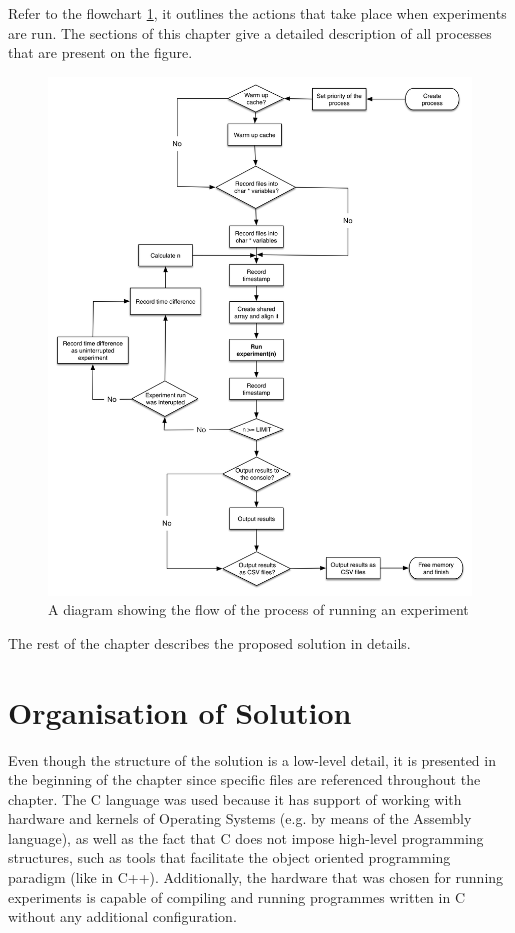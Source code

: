 Refer to the flowchart \ref{flowExperiment}, it outlines the actions that take place when experiments are run. The sections of this chapter give a detailed description of all processes that are present on the figure.

\begin{figure}[ht!]
\centering
\includegraphics[width=145mm]{4/flow_experiment.png}
\caption{A diagram showing the flow of the process of running an experiment}
\label{flowExperiment}
\end{figure}

The rest of the chapter describes the proposed solution in details.

\section{Organisation of Solution}
\label{fileStrcture}

Even though the structure of the solution is a low-level detail, it is presented in the beginning of the chapter since specific files are referenced throughout the chapter. The C language was used because it has support of working with hardware and kernels of Operating Systems (e.g. by means of the Assembly language), as well as the fact that C does not impose high-level programming structures, such as tools that facilitate the object oriented programming paradigm (like in C++). Additionally, the hardware that was chosen for running experiments is capable of compiling and running programmes written in C without any additional configuration.

